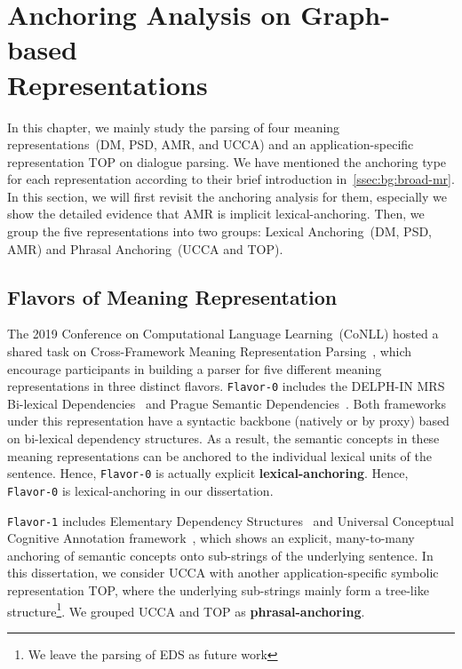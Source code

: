 \section[Anchoring Analysis on Graph-based Representations]{Anchoring Analysis on Graph-based \\Representations}
\label{sec:lex-phr:factorization-analysis}

In this chapter, we mainly study the parsing of four meaning
representations~(DM, PSD, AMR, and UCCA) and an application-specific
representation TOP on dialogue parsing. We have mentioned the
anchoring type for each representation according to their brief
introduction in~\autoref{ssec:bg:broad-mr}. In this section, we will
first revisit the anchoring analysis for them, especially we show the
detailed evidence that AMR is implicit lexical-anchoring. Then, we
group the five representations into two groups: Lexical Anchoring~(DM,
PSD, AMR) and Phrasal Anchoring~(UCCA and TOP).

\subsection{Flavors of Meaning Representation}
\label{ssec:lex-phr:flavors}

The 2019 Conference on Computational Language Learning~(CoNLL) hosted
a shared task on Cross-Framework Meaning Representation
Parsing~\cite[MRP 2019,][]{Oep:Abe:Haj:19}, which encourage
participants in building a parser for five different meaning
representations in three distinct flavors. \texttt{Flavor-0} includes
the DELPH-IN MRS Bi-lexical Dependencies~\cite[DM,][]{ivanova2012did}
and Prague Semantic
Dependencies~\cite[PSD,][]{hajic2012announcing,miyao2014house}. Both
frameworks under this representation have a syntactic backbone
(natively or by proxy) based on bi-lexical dependency
structures. As a result, the semantic concepts in these meaning
representations can be anchored to the individual lexical units of the
sentence. Hence, \texttt{Flavor-0} is actually explicit
\textbf{lexical-anchoring}. Hence, \texttt{Flavor-0} is
lexical-anchoring in our dissertation.

\texttt{Flavor-1} includes Elementary Dependency
Structures~\cite[EDS,][]{oepen2006discriminant} and Universal
Conceptual Cognitive Annotation
framework~\cite[UCCA,][]{abend2013universal}, which shows an explicit,
many-to-many anchoring of semantic concepts onto sub-strings of the
underlying sentence. In this dissertation, we consider UCCA with another
application-specific symbolic representation TOP, where the underlying
sub-strings mainly form a tree-like structure\footnote{We leave the
  parsing of EDS as future work}. We grouped UCCA and TOP as
\textbf{phrasal-anchoring}.

